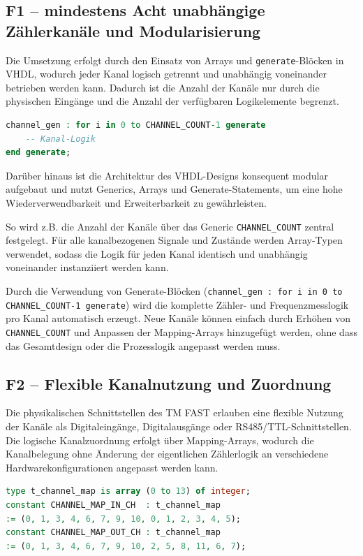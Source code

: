 \subsection*{F1 – mindestens Acht unabhängige Zählerkanäle und Modularisierung}

Die Umsetzung erfolgt durch den Einsatz von Arrays und \texttt{generate}-Blöcken in VHDL, wodurch jeder Kanal logisch getrennt und unabhängig voneinander betrieben werden kann.
Dadurch ist die Anzahl der Kanäle nur durch die physischen Eingänge und die Anzahl der verfügbaren Logikelemente begrenzt.

\begin{lstlisting}[language=VHDL, caption={Generate-Struktur für mehrere Kanäle}, label={lst:generate}]
channel_gen : for i in 0 to CHANNEL_COUNT-1 generate
    -- Kanal-Logik
end generate;
\end{lstlisting}

Darüber hinaus ist die Architektur des VHDL-Designs konsequent modular aufgebaut und nutzt Generics, Arrays und Generate-Statements, um eine hohe Wiederverwendbarkeit und Erweiterbarkeit zu gewährleisten. 

So wird z.B. die Anzahl der Kanäle über das Generic \texttt{CHANNEL\_COUNT} zentral festgelegt. Für alle kanalbezogenen Signale und Zustände werden Array-Typen verwendet, sodass die Logik für jeden Kanal identisch und unabhängig voneinander instanziiert werden kann.

Durch die Verwendung von Generate-Blöcken (\texttt{channel\_gen : for i in 0 to CHANNEL\_COUNT-1 generate}) wird die komplette Zähler- und Frequenzmesslogik pro Kanal automatisch erzeugt. Neue Kanäle können einfach durch Erhöhen von \texttt{CHANNEL\_COUNT} und Anpassen der Mapping-Arrays hinzugefügt werden, ohne dass das Gesamtdesign oder die Prozesslogik angepasst werden muss.

\subsection*{F2 – Flexible Kanalnutzung und Zuordnung}

Die physikalischen Schnittstellen des TM FAST erlauben eine flexible Nutzung der Kanäle als Digitaleingänge, Digitalausgänge oder RS485/TTL-Schnittstellen. Die logische Kanalzuordnung erfolgt über Mapping-Arrays, wodurch die Kanalbelegung ohne Änderung der eigentlichen Zählerlogik an verschiedene Hardwarekonfigurationen angepasst werden kann.

\begin{lstlisting}[language=VHDL, caption={Beispiel einer Kanalzuordnung}, label={lst:kanalzuordnung}]
type t_channel_map is array (0 to 13) of integer;
constant CHANNEL_MAP_IN_CH  : t_channel_map 
:= (0, 1, 3, 4, 6, 7, 9, 10, 0, 1, 2, 3, 4, 5);
constant CHANNEL_MAP_OUT_CH : t_channel_map 
:= (0, 1, 3, 4, 6, 7, 9, 10, 2, 5, 8, 11, 6, 7);
\end{lstlisting}


